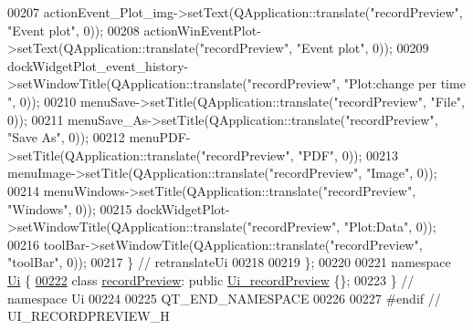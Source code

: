 \begin{DoxyCode}
00207         actionEvent\_Plot\_img->setText(QApplication::translate(\textcolor{stringliteral}{"recordPreview"}, \textcolor{stringliteral}{"Event plot"}, 0));
00208         actionWinEventPlot->setText(QApplication::translate(\textcolor{stringliteral}{"recordPreview"}, \textcolor{stringliteral}{"Event plot"}, 0));
00209         dockWidgetPlot\_event\_history->setWindowTitle(QApplication::translate(\textcolor{stringliteral}{"recordPreview"}, \textcolor{stringliteral}{"Plot:change
       per time "}, 0));
00210         menuSave->setTitle(QApplication::translate(\textcolor{stringliteral}{"recordPreview"}, \textcolor{stringliteral}{"File"}, 0));
00211         menuSave\_As->setTitle(QApplication::translate(\textcolor{stringliteral}{"recordPreview"}, \textcolor{stringliteral}{"Save As"}, 0));
00212         menuPDF->setTitle(QApplication::translate(\textcolor{stringliteral}{"recordPreview"}, \textcolor{stringliteral}{"PDF"}, 0));
00213         menuImage->setTitle(QApplication::translate(\textcolor{stringliteral}{"recordPreview"}, \textcolor{stringliteral}{"Image"}, 0));
00214         menuWindows->setTitle(QApplication::translate(\textcolor{stringliteral}{"recordPreview"}, \textcolor{stringliteral}{"Windows"}, 0));
00215         dockWidgetPlot->setWindowTitle(QApplication::translate(\textcolor{stringliteral}{"recordPreview"}, \textcolor{stringliteral}{"Plot:Data"}, 0));
00216         toolBar->setWindowTitle(QApplication::translate(\textcolor{stringliteral}{"recordPreview"}, \textcolor{stringliteral}{"toolBar"}, 0));
00217     \} \textcolor{comment}{// retranslateUi}
00218 
00219 \};
00220 
00221 \textcolor{keyword}{namespace }\hyperlink{a00145}{Ui} \{
\hypertarget{a00140_source_l00222}{}\hyperlink{a00074}{00222}     \textcolor{keyword}{class }\hyperlink{a00074}{recordPreview}: \textcolor{keyword}{public} \hyperlink{a00081}{Ui\_recordPreview} \{\};
00223 \} \textcolor{comment}{// namespace Ui}
00224 
00225 QT\_END\_NAMESPACE
00226 
00227 \textcolor{preprocessor}{#endif // UI\_RECORDPREVIEW\_H}
\end{DoxyCode}
